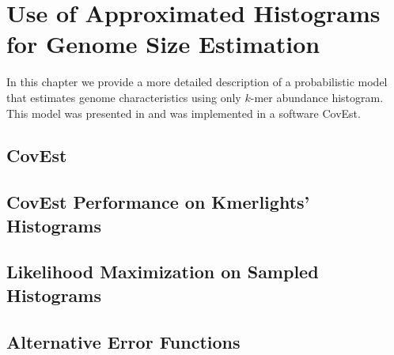 \chapter{Use of Approximated Histograms for Genome Size Estimation}
In this chapter we provide a more detailed description of a probabilistic model
that estimates genome characteristics using only $k$-mer abundance histogram.
This model was presented in \cite{Hozza2015, Hozza2016} and was implemented in a software CovEst.

\section{CovEst}

\section{CovEst Performance on Kmerlights' Histograms}

\section{Likelihood Maximization on Sampled Histograms}

\section{Alternative Error Functions}

